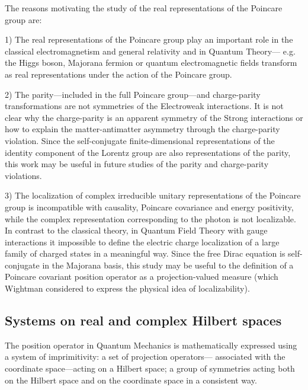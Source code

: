 \documentclass[11pt]{book}
\begin{document}
The reasons motivating the study of the real representations of the
Poincare group are:

1) The real representations of the Poincare group play an important role
in the classical electromagnetism and general
relativity\cite{Poplawski2009Spacetime}\cite{Capozziello2011Extended} and in Quantum Theory--- e.g. the Higgs boson,
Majorana fermion or quantum electromagnetic fields transform as real
representations under the action of the Poincare group.

2) The parity---included in the full Poincare group---and charge-parity
transformations are not symmetries of the Electroweak
interactions\cite{Branco1999CP}.
It is not clear why the charge-parity is an apparent symmetry of the
Strong interactions\cite{Peccei2008Strong} or how to explain the matter-antimatter
asymmetry\cite{Canetti2012Matter} through the charge-parity violation. Since the self-conjugate
finite-dimensional representations of the identity component of the
Lorentz group are also representations of the parity, this work may be
useful in future studies of the parity and charge-parity violations.

3) The localization of complex irreducible unitary representations of
the Poincare group is incompatible with causality, Poincare covariance
and energy
positivity\cite{Perez1977Localization}\cite{Hegerfeldt1998Instantaneous}\cite{Hegerfeldt1998Causality}\cite{Thaller1992dirac}\cite{Thaller1984Remarks}\cite{Plaschke2012Massless}, while the complex representation corresponding to the
photon is not
localizable\cite{Newton1949Localized}\cite{Varadarajan2007Geometry}. In contrast to the classical theory, in Quantum Field Theory
with gauge interactions it impossible to define the electric charge
localization of a large family of charged states in a meaningful
way\cite{Strocchi2013introduction}.
Since the free Dirac equation is self-conjugate in the Majorana basis,
this study may be useful to the definition of a Poincare covariant
position operator as a projection-valued measure (which Wightman
considered to express the physical idea of
localizability\cite{Wightman1962On}).

\hypertarget{systems-on-real-and-complex-hilbert-spaces}{%
\subsection{Systems on real and complex Hilbert
spaces}\label{systems-on-real-and-complex-hilbert-spaces}}

The position operator in Quantum Mechanics is mathematically expressed
using a system of imprimitivity: a set of projection operators---
associated with the coordinate space---acting on a Hilbert space; a
group of symmetries acting both on the Hilbert space and on the
coordinate space in a consistent
way\cite{Varadarajan2007Geometry}\cite{Teschl2009Mathematical}.
\end{document}
